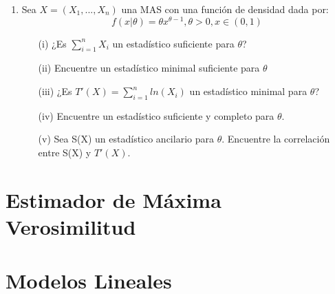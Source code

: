 \begin{enumerate}
    \item Sea $X=(X_1,...,X_n)$ una MAS con una función de densidad dada por:
    \begin{equation}
        \nonumber 
        f(x|\theta)=\theta x^{\theta -1},\theta>0,x\in (0,1)
    \end{equation}
    
    \begin{itemize}
        \item[(i)] ¿Es $\sum\limits_{i=1}^{n}X_i$ un estadístico suficiente para $\theta$?
        
        \item[(ii)] Encuentre un estadístico minimal suficiente para $\theta$
    
        \item[(iii)]  ¿Es $T'(X)=\sum\limits_{i=1}^{n}ln(X_i)$ un estadístico minimal para $\theta$?
        
        \item[(iv)] Encuentre un estadístico suficiente y completo para $\theta$.
        
        \item[(v)] Sea S(X) un estadístico ancilario para $\theta$. Encuentre la correlación entre S(X) y $T'(X)$.
        
    \end{itemize}
    
\end{enumerate}


\section{Estimador de Máxima Verosimilitud}


\section{Modelos Lineales}

